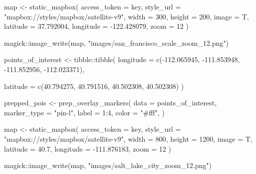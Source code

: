 \documentclass[
  letterpaper,
  DIV=11,
  numbers=noendperiod]{scrreprt}
\newenvironment{Shaded}{\begin{snugshade}}{\end{snugshade}}
\newcommand{\AttributeTok}[1]{\textcolor[rgb]{0.40,0.45,0.13}{#1}}
\newcommand{\DecValTok}[1]{\textcolor[rgb]{0.68,0.00,0.00}{#1}}
\newcommand{\FloatTok}[1]{\textcolor[rgb]{0.68,0.00,0.00}{#1}}
\newcommand{\FunctionTok}[1]{\textcolor[rgb]{0.28,0.35,0.67}{#1}}
\newcommand{\NormalTok}[1]{\textcolor[rgb]{0.00,0.23,0.31}{#1}}
\newcommand{\OtherTok}[1]{\textcolor[rgb]{0.00,0.23,0.31}{#1}}
\newcommand{\SpecialCharTok}[1]{\textcolor[rgb]{0.37,0.37,0.37}{#1}}
\newcommand{\StringTok}[1]{\textcolor[rgb]{0.13,0.47,0.30}{#1}}
\begin{document}
\begin{Shaded}
\begin{Highlighting}[]
\NormalTok{map }\OtherTok{\textless{}{-}} \FunctionTok{static\_mapbox}\NormalTok{(}
  \AttributeTok{access\_token =}\NormalTok{ key,}
  \AttributeTok{style\_url =} \StringTok{"mapbox://styles/mapbox/satellite{-}v9"}\NormalTok{,}
  \AttributeTok{width =} \DecValTok{300}\NormalTok{,}
  \AttributeTok{height =} \DecValTok{200}\NormalTok{, }
  \AttributeTok{image =}\NormalTok{ T, }\AttributeTok{latitude =} \FloatTok{37.792004}\NormalTok{, }\AttributeTok{longitude =} \SpecialCharTok{{-}}\FloatTok{122.428079}\NormalTok{, }\AttributeTok{zoom =} \DecValTok{12}
\NormalTok{)}

\NormalTok{magick}\SpecialCharTok{::}\FunctionTok{image\_write}\NormalTok{(map, }\StringTok{"images/san\_francisco\_scale\_zoom\_12.png"}\NormalTok{)}
\end{Highlighting}
\end{Shaded}

\begin{Shaded}
\begin{Highlighting}[]
\NormalTok{points\_of\_interest }\OtherTok{\textless{}{-}}\NormalTok{ tibble}\SpecialCharTok{::}\FunctionTok{tibble}\NormalTok{(}
  \AttributeTok{longitude =} \FunctionTok{c}\NormalTok{(}\SpecialCharTok{{-}}\FloatTok{112.065945}\NormalTok{, }\SpecialCharTok{{-}}\FloatTok{111.853948}\NormalTok{, }
                \SpecialCharTok{{-}}\FloatTok{111.852956}\NormalTok{, }\SpecialCharTok{{-}}\FloatTok{112.023371}\NormalTok{),}
  
  \AttributeTok{latitude =} \FunctionTok{c}\NormalTok{(}\FloatTok{40.794275}\NormalTok{, }\FloatTok{40.791516}\NormalTok{, }
               \FloatTok{40.502308}\NormalTok{, }\FloatTok{40.502308}\NormalTok{)}
\NormalTok{  )}

\NormalTok{prepped\_pois }\OtherTok{\textless{}{-}} \FunctionTok{prep\_overlay\_markers}\NormalTok{(}
  \AttributeTok{data =}\NormalTok{ points\_of\_interest,}
  \AttributeTok{marker\_type =} \StringTok{"pin{-}l"}\NormalTok{,}
  \AttributeTok{label =} \DecValTok{1}\SpecialCharTok{:}\DecValTok{4}\NormalTok{,}
  \AttributeTok{color =} \StringTok{"\#fff"}\NormalTok{, }
\NormalTok{)}

\NormalTok{map }\OtherTok{\textless{}{-}} \FunctionTok{static\_mapbox}\NormalTok{(}
  \AttributeTok{access\_token =}\NormalTok{ key,}
  \AttributeTok{style\_url =} \StringTok{"mapbox://styles/mapbox/satellite{-}v9"}\NormalTok{,}
  \AttributeTok{width =} \DecValTok{800}\NormalTok{,}
  \AttributeTok{height =} \DecValTok{1200}\NormalTok{, }
  \AttributeTok{image =}\NormalTok{ T, }
  \AttributeTok{latitude =} \FloatTok{40.7}\NormalTok{,}
  \AttributeTok{longitude =} \SpecialCharTok{{-}}\FloatTok{111.876183}\NormalTok{, }\AttributeTok{zoom =} \DecValTok{12}
\NormalTok{)}

\NormalTok{magick}\SpecialCharTok{::}\FunctionTok{image\_write}\NormalTok{(map, }\StringTok{"images/salt\_lake\_city\_zoom\_12.png"}\NormalTok{)}
\end{Highlighting}
\end{Shaded}
\end{document}
